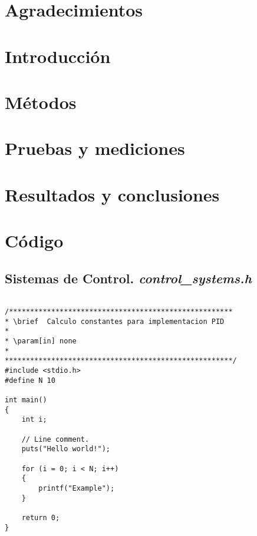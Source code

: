 \documentclass[a4paper,openright,12pt]{book}
\begin{document}
\chapter*{Agradecimientos}
\thispagestyle{empty}
\blindtext

\tableofcontents{\thispagestyle{empty}}

\listoffigures{\thispagestyle{empty}}

\listoftables{\thispagestyle{empty}}



\chapter{Introducción}
\setcounter{page}{1 }
\blindtext

\chapter{Métodos}
\blindtext

\chapter{Pruebas y mediciones}
\blindtext

\chapter{Resultados y conclusiones}
\blindtext

\appendix
\chapter{Código}
\section{Sistemas de Control. \textit{control\_systems.h}}
\begin{lstlisting}[frame=single]

/*****************************************************
* \brief  Calculo constantes para implementacion PID
*
* \param[in] none
*
******************************************************/
#include <stdio.h>
#define N 10

int main()
{
    int i;

    // Line comment.
    puts("Hello world!");
    
    for (i = 0; i < N; i++)
    {
        printf("Example");
    }

    return 0;
}
\end{lstlisting}
\end{document}

